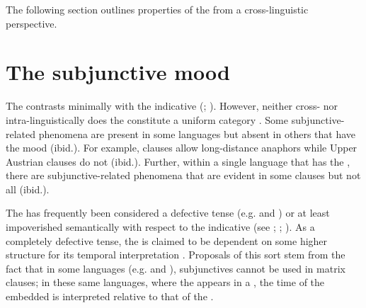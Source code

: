 \documentclass[output=paper,modfonts,newtxmath,hidelinks,]{langscibook}
\begin{document}
\ea \label{10:ex18}
\z\z

\noindent The following section outlines properties of the  from a cross-linguistic perspective. 

\section{The subjunctive mood}\label{10:s3}

The  contrasts minimally with the indicative (\citealt[660]{Quer2006}; \citealt[218]{Wiltschko}). However, neither cross- nor intra-linguistically does the  constitute a uniform category \citep[661]{Quer2006}. Some subjunc\-tive-related phenomena are present in some languages but absent in others that have the mood (ibid.). For example,   clauses allow long-distance anaphors while Upper Austrian   clauses do not (ibid.). Further, within a single language that has the , there are sub\-junc\-tive-related phenomena that are evident in some  clauses but not all (ibid.).

The  has frequently been considered a defective tense (e.g. \citealt{Picallo1984} and \citealt{Giannakidou2009}) or at least impoverished semantically with respect to the indicative (see \citealt{Cowper2002}; \citealt{Cowper2005}; \citealt{Schlenker2005}). As a completely defective tense, the  is claimed to be dependent on some higher structure for its temporal interpretation \citep[2]{Wiltschko}. Proposals of this sort stem from the fact that in some languages (e.g.  and ), subjunctives cannot be used in matrix clauses; in these same languages, where the  appears in a , the time of the embedded  is interpreted relative to that of the  \citep{Wiltschko}.\largerpage[-1]
\end{document}
